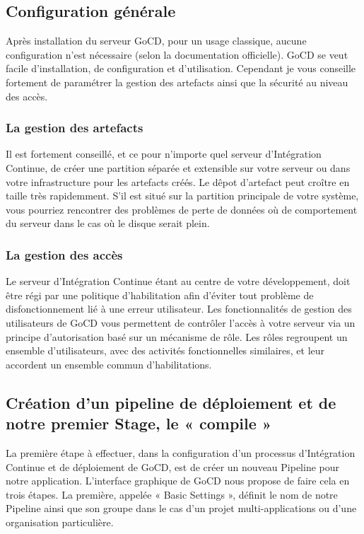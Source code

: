       \subsection{Configuration générale}
      Après installation du serveur GoCD, pour un usage classique, aucune configuration n'est nécessaire (selon la documentation officielle). GoCD se veut facile d'installation, de configuration et d'utilisation. Cependant je vous conseille fortement de paramétrer la gestion des artefacts ainsi que la sécurité au niveau des accès.

        \subsubsection{La gestion des artefacts}
        Il est fortement conseillé, et ce pour n'importe quel serveur d'Intégration Continue, de créer une partition séparée et extensible sur votre serveur ou dans votre infrastructure pour les artefacts créés. Le dêpot d'artefact peut croître en taille très rapidemment. S'il est situé sur la partition principale de votre système, vous pourriez rencontrer des problèmes de perte de données où de comportement du serveur dans le cas où le disque serait plein.

        \subsubsection{La gestion des accès}
        Le serveur d'Intégration Continue étant au centre de votre développement, doit être régi par une politique d'habilitation afin d'éviter tout problème de disfonctionnement lié à une erreur utilisateur. Les fonctionnalités de gestion des utilisateurs de GoCD vous permettent de contrôler l'accès à votre serveur via un principe d'autorisation basé sur un mécanisme de rôle. Les rôles regroupent un ensemble d'utilisateurs, avec des activités fonctionnelles similaires, et leur accordent un ensemble commun d'habilitations.

      \subsection{Création d'un pipeline de déploiement et de notre premier Stage, le « compile »}
      La première étape à effectuer, dans la configuration d'un processus d'Intégration Continue et de déploiement de GoCD, est de créer un nouveau Pipeline pour notre application. L'interface graphique de GoCD nous propose de faire cela en trois étapes. La première, appelée « Basic Settings », définit le nom de notre Pipeline ainsi que son groupe dans le cas d'un projet multi-applications ou d'une organisation particulière.\\

